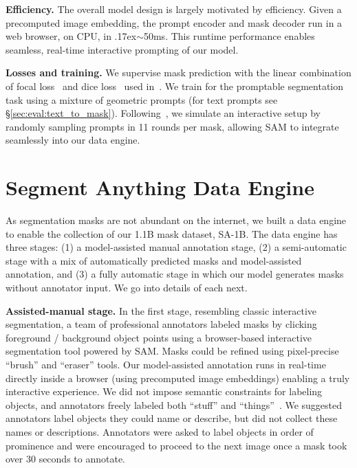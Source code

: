 \textbf{Efficiency.} The overall model design is largely motivated by efficiency. Given a precomputed image embedding, the prompt encoder and mask decoder run in a web browser, on CPU, in \raise.17ex\hbox{$\scriptstyle\sim$}50ms. This runtime performance enables seamless, real-time interactive prompting of our model.

\textbf{Losses and training.} We supervise mask prediction with the linear combination of focal loss~\cite{Lin2017a} and dice loss~\cite{milletari2016v} used in~\cite{Carion2020}. We train for the promptable segmentation task using a mixture of geometric prompts (for text prompts see \S\ref{sec:eval:text_to_mask}). Following~\cite{sofiiuk2022reviving,forte2020getting}, we simulate an interactive setup by randomly sampling prompts in 11 rounds per mask, allowing SAM to integrate seamlessly into our data engine.

\section{Segment Anything Data Engine}\label{sec:engine}

As segmentation masks are not abundant on the internet, we built a data engine to enable the collection of our 1.1B mask dataset, \mbox{SA-1B}. The data engine has three stages: (1) a model-assisted manual annotation stage, (2) a semi-automatic stage with a mix of automatically predicted masks and model-assisted annotation, and (3) a fully automatic stage in which our model generates masks without annotator input. We go into details of each next.

\textbf{Assisted-manual stage.} In the first stage, resembling classic interactive segmentation, a team of professional annotators labeled masks by clicking foreground / background object points using a browser-based interactive segmentation tool powered by SAM. Masks could be refined using pixel-precise ``brush'' and ``eraser'' tools. Our model-assisted annotation runs in real-time directly inside a browser (using precomputed image embeddings) enabling a truly interactive experience. We did not impose semantic constraints for labeling objects, and annotators freely labeled both ``stuff'' and ``things''~\cite{adelson2001seeing}. We suggested annotators label objects they could name or describe, but did not collect these names or descriptions. Annotators were asked to label objects in order of prominence and were encouraged to proceed to the next image once a mask took over 30 seconds to annotate.

